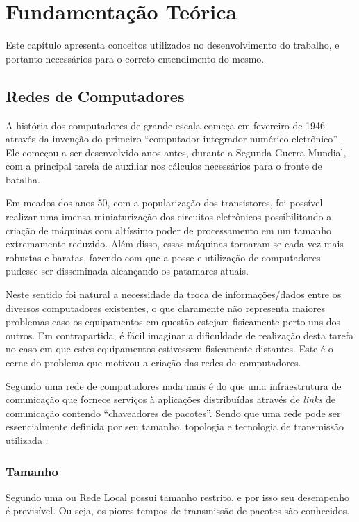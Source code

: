 \chapter{Fundamentação Teórica}
Este capítulo apresenta conceitos utilizados no desenvolvimento do trabalho, e portanto necessários para o correto entendimento do mesmo.

\section{Redes de Computadores}
A história dos computadores de grande escala começa em fevereiro de 1946 através da invenção do primeiro ``computador integrador numérico eletrônico''  \cite{Book_Jean2013}. Ele começou a ser desenvolvido anos antes, durante a Segunda Guerra Mundial, com a principal tarefa de auxiliar nos cálculos necessários para o fronte de batalha.

Em meados dos anos 50, com a popularização dos transistores, foi possível realizar uma imensa miniaturização dos circuitos eletrônicos possibilitando a criação de máquinas com altíssimo poder de processamento em um tamanho extremamente reduzido. Além disso, essas máquinas tornaram-se cada vez mais robustas e baratas, fazendo com que a posse e utilização de computadores pudesse ser disseminada alcançando os patamares atuais.

Neste sentido foi natural a necessidade da troca de informações/dados entre os diversos computadores existentes, o que claramente não representa maiores problemas caso os equipamentos em questão estejam fisicamente perto uns dos outros. Em contrapartida, é fácil imaginar a dificuldade de realização desta tarefa no caso em que estes equipamentos estivessem fisicamente distantes. Este é o cerne do problema que motivou a criação das redes de computadores.

Segundo \cite{Book_Kurose2013} uma rede de computadores nada mais é do que uma infraestrutura de comunicação que fornece serviços à aplicações distribuídas através de \emph{links} de comunicação contendo ``chaveadores de pacotes''. Sendo que uma rede pode ser essencialmente definida por seu tamanho, topologia e tecnologia de transmissão utilizada \cite{Book_Tanenbaum2003}. 

\subsection{Tamanho}
Segundo \cite{Book_Tanenbaum2003} uma  ou Rede Local possui tamanho restrito, e por isso seu desempenho é previsível. Ou seja, os piores tempos de transmissão de pacotes são conhecidos. 

